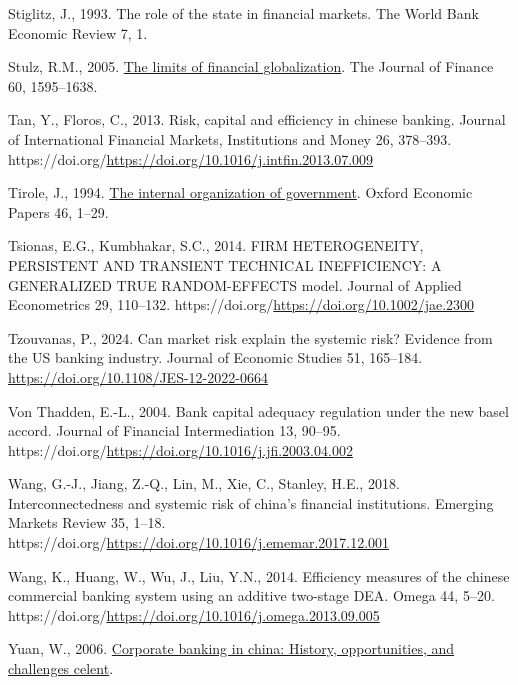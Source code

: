 \documentclass[
  12pt,
  a4paper,
]{scrreprt}
\newlength{\cslhangindent}
\newenvironment{CSLReferences}[2] %
 {\begin{list}{}{%
  \setlength{\itemindent}{0pt}
  \setlength{\leftmargin}{0pt}
  \setlength{\parsep}{0pt}
  \ifodd #1
   \setlength{\leftmargin}{\cslhangindent}
   \setlength{\itemindent}{-1\cslhangindent}
  \fi
  \setlength{\itemsep}{#2\baselineskip}}}
 {\end{list}}
\begin{document}
{{{{\begin{CSLReferences}{1}{0}
Stiglitz, J., 1993. The role of the state in financial markets. The
World Bank Economic Review 7, 1.

Stulz, R.M., 2005.
\href{http://www.jstor.org.queens.ezp1.qub.ac.uk/stable/3694849}{The
limits of financial globalization}. The Journal of Finance 60,
1595--1638.

Tan, Y., Floros, C., 2013. Risk, capital and efficiency in chinese
banking. Journal of International Financial Markets, Institutions and
Money 26, 378--393.
https://doi.org/\url{https://doi.org/10.1016/j.intfin.2013.07.009}

Tirole, J., 1994. \href{http://www.jstor.org/stable/2663521}{The
internal organization of government}. Oxford Economic Papers 46, 1--29.

Tsionas, E.G., Kumbhakar, S.C., 2014. FIRM HETEROGENEITY, PERSISTENT AND
TRANSIENT TECHNICAL INEFFICIENCY: A GENERALIZED TRUE RANDOM-EFFECTS
model. Journal of Applied Econometrics 29, 110--132.
https://doi.org/\url{https://doi.org/10.1002/jae.2300}

Tzouvanas, P., 2024. Can market risk explain the systemic risk? Evidence
from the US banking industry. Journal of Economic Studies 51, 165--184.
\url{https://doi.org/10.1108/JES-12-2022-0664}

Von Thadden, E.-L., 2004. Bank capital adequacy regulation under the new
basel accord. Journal of Financial Intermediation 13, 90--95.
https://doi.org/\url{https://doi.org/10.1016/j.jfi.2003.04.002}

Wang, G.-J., Jiang, Z.-Q., Lin, M., Xie, C., Stanley, H.E., 2018.
Interconnectedness and systemic risk of china's financial institutions.
Emerging Markets Review 35, 1--18.
https://doi.org/\url{https://doi.org/10.1016/j.ememar.2017.12.001}

Wang, K., Huang, W., Wu, J., Liu, Y.N., 2014. Efficiency measures of the
chinese commercial banking system using an additive two-stage DEA. Omega
44, 5--20.
https://doi.org/\url{https://doi.org/10.1016/j.omega.2013.09.005}

Yuan, W., 2006.
\href{https://www.celent.com/insights/314000619}{Corporate banking in
china: History, opportunities, and challenges \textbar{} celent}.


\end{CSLReferences}}}}}
\end{document}
